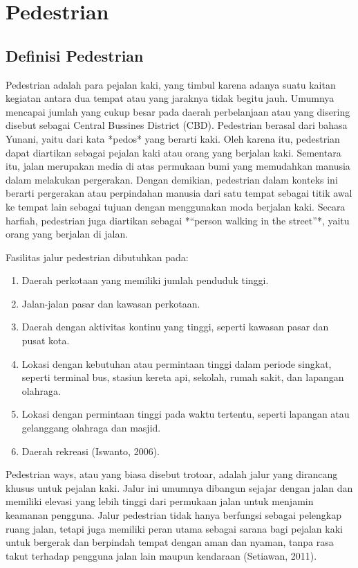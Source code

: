 \documentclass[../rumukota.tex]{subfiles}
\begin{document}
\section{Pedestrian}%
\label{sec:Pedestarian}

\subsection{Definisi Pedestrian}%
\label{sub:definisi_pedestarian}

Pedestrian adalah para pejalan kaki, yang timbul karena adanya suatu kaitan kegiatan antara dua tempat atau yang jaraknya tidak begitu jauh. Umumnya mencapai jumlah yang cukup besar pada daerah perbelanjaan atau yang disering disebut sebagai Central Bussines District (CBD). Pedestrian berasal dari bahasa Yunani, yaitu dari kata *pedos* yang berarti kaki. Oleh karena itu, pedestrian dapat diartikan sebagai pejalan kaki atau orang yang berjalan kaki. Sementara itu, jalan merupakan media di atas permukaan bumi yang memudahkan manusia dalam melakukan pergerakan. Dengan demikian, pedestrian dalam konteks ini berarti pergerakan atau perpindahan manusia dari satu tempat sebagai titik awal ke tempat lain sebagai tujuan dengan menggunakan moda berjalan kaki. Secara harfiah, pedestrian juga diartikan sebagai *“person walking in the street”*, yaitu orang yang berjalan di jalan.

Fasilitas jalur pedestrian dibutuhkan pada:

\begin{enumerate}
	\item Daerah perkotaan yang memiliki jumlah penduduk tinggi.
	\item Jalan-jalan pasar dan kawasan perkotaan.
	\item Daerah dengan aktivitas kontinu yang tinggi, seperti kawasan pasar dan pusat kota.
	\item Lokasi dengan kebutuhan atau permintaan tinggi dalam periode singkat, seperti terminal bus, stasiun kereta api, sekolah, rumah sakit, dan lapangan olahraga.
	\item Lokasi dengan permintaan tinggi pada waktu tertentu, seperti lapangan atau gelanggang olahraga dan masjid.
	\item Daerah rekreasi (Iswanto, 2006).
\end{enumerate}

Pedestrian ways, atau yang biasa disebut trotoar, adalah jalur yang dirancang khusus untuk pejalan kaki. Jalur ini umumnya dibangun sejajar dengan jalan dan memiliki elevasi yang lebih tinggi dari permukaan jalan untuk menjamin keamanan pengguna. Jalur pedestrian tidak hanya berfungsi sebagai pelengkap ruang jalan, tetapi juga memiliki peran utama sebagai sarana bagi pejalan kaki untuk bergerak dan berpindah tempat dengan aman dan nyaman, tanpa rasa takut terhadap pengguna jalan lain maupun kendaraan (Setiawan, 2011).
\end{document}
